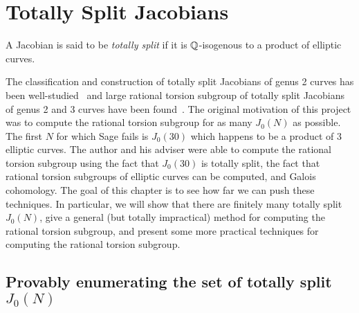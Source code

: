 \chapter{Totally Split Jacobians}%
\label{chap:totally_split}

A Jacobian is said to be \emph{totally split} if it is $\mathbb{Q}$-isogenous to a
product of elliptic curves. 

The classification and construction of totally
split Jacobians of genus 2 curves has been
well-studied~\cite{bruin-doerksen:split_genus_two,kuhn:split_genus_two} and
large rational torsion subgroup of totally split Jacobians of genus 2 and 3
curves have been found~\cite{howe-leprevost-poonen:large}. The original
motivation of this project was to compute the rational torsion subgroup for as
many $J_0(N)$ as possible. The first $N$ for which Sage fails is $J_0(30)$
which happens to be a product of 3 elliptic curves. The author and his adviser
were able to compute the rational torsion subgroup using the fact that
$J_0(30)$ is totally split, the fact that rational torsion subgroups of
elliptic curves can be computed, and Galois cohomology. The goal of this
chapter is to see how far we can push these techniques. In particular, we will
show that there are finitely many totally split $J_0(N)$, give a general (but
totally impractical) method for computing the rational torsion subgroup, and
present some more practical techniques for computing the rational torsion
subgroup.


\section{Provably enumerating the set of totally split $J_0(N)$}
\label{sec:provably_enumerating}

